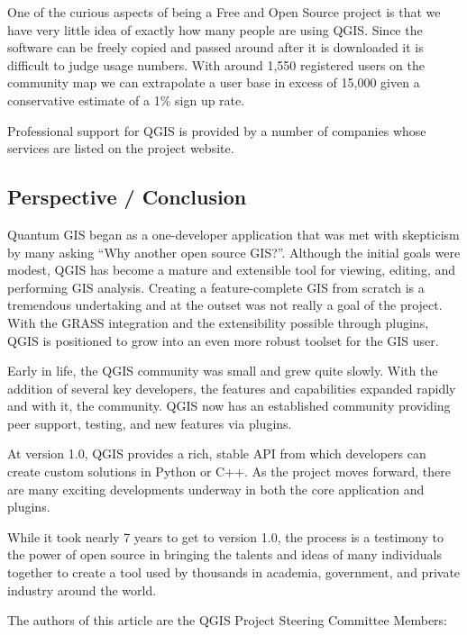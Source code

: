 One of the curious aspects of being a Free and Open Source project is that we 
have very little idea of exactly how many people are using QGIS. Since the software can 
be freely copied and passed around after it is downloaded it is difficult to 
judge usage numbers. With around 1,550 registered users on the community map 
we can extrapolate a user base in excess of 15,000 given a conservative 
estimate of a 1\% sign up rate.

Professional support for QGIS is provided by a number of companies whose
services are listed on the project website.

\subsection{Perspective / Conclusion}

Quantum GIS began as a one-developer application that was met with skepticism
by many asking ``Why another open source GIS?''. Although the initial goals
were modest, QGIS has become a mature and extensible tool for viewing,
editing, and performing GIS analysis. Creating a feature-complete GIS from
scratch is a tremendous undertaking and at the outset was not really a goal of
the project. With the GRASS integration and the extensibility possible through
plugins, QGIS is positioned to grow into an even more robust toolset for the
GIS user. 

Early in life, the QGIS community was small and grew quite slowly.
With the addition of several key developers, the features and capabilities
expanded rapidly and with it, the community. QGIS now has an established
community providing peer support, testing, and new features via plugins. 

At version 1.0, QGIS provides a rich, stable API from which developers can
create custom solutions in Python or C++. As the project moves forward, 
there are many exciting developments underway in both the core application and
plugins. 

While it took nearly 7 years to get to version 1.0, the process is a
testimony to the power of open source in bringing the talents and ideas of
many individuals together to create a tool used by thousands in academia,
government, and private industry around the world.


The authors of this article are the QGIS Project Steering Committee Members:

